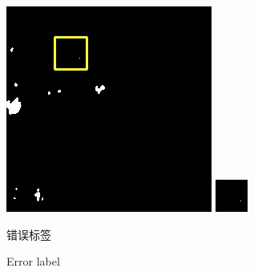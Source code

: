 \documentclass[10pt]{ctexart}
\begin{document}
\begin{multicols}{2}
\begin{figure}[H]
{\begin{minipage}[b]{0.15\linewidth}
            \includegraphics[width=1\linewidth]{../log/spoon2/cut2/LC81620432014072LGN00_16329_unet.jpg}\vspace{4pt}
            \includegraphics[width=1\linewidth]{../log/spoon2/cut2/tmp_cut_LC81620432014072LGN00_16329_unet.jpg}\vspace{4pt}
        \end{minipage}
    }
\caption{错误标签}
\addtocounter{figure}{-1}
\vspace{-5pt}
\renewcommand{\figurename}{Fig}
\caption{Error label}
\renewcommand{\figurename}{图}
\label{Fig.main2}
\end{figure}


\end{multicols}
\end{document}
